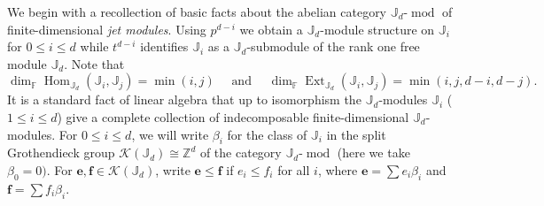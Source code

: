 \documentclass{amsart}
\numberwithin{equation}{section}
\theoremstyle{definition}
\def\FF{\mathbb{F}}
\def\JJ{\mathbb{J}}
\def\ZZ{\mathbb{Z}}
\def\bfe{\mathbf{e}}
\def\bff{\mathbf{f}}
\def\cK{\mathcal{K}}
\def\dim{\operatorname{dim}}
\def\mod{\operatorname{mod}}
\def\Hom{\operatorname{Hom}}
\def\Ext{\operatorname{Ext}}
\def\mod{\operatorname{mod}}
\begin{document}
We begin with a recollection of basic facts about the abelian category $\JJ_d$-$\mod$ of finite-dimensional \emph{jet modules}.  Using $p^{d-i}$ we obtain a $\JJ_d$-module structure on $\JJ_i$ for $0\le i\le d$ while $t^{d-i}$ identifies $\JJ_i$ as a $\JJ_d$-submodule of the rank one free module $\JJ_d$.  Note that 
\begin{equation}\label{eq:hom and ext}
  \dim_\FF\Hom_{\JJ_d}(\JJ_i,\JJ_j)=\min(i,j)\quad\text{ and }\quad\dim_\FF\Ext_{\JJ_d}(\JJ_i,\JJ_j)=\min(i,j,d-i,d-j).
\end{equation}
It is a standard fact of linear algebra that up to isomorphism the $\JJ_d$-modules $\JJ_i$ ($1\le i\le d$) give a complete collection of indecomposable finite-dimensional $\JJ_d$-modules.  For $0\le i\le d$, we will write $\beta_i$ for the class of $\JJ_i$ in the split Grothendieck group $\cK(\JJ_d)\cong\ZZ^d$ of the category $\JJ_d$-$\mod$ (here we take $\beta_0=0)$.  For $\bfe,\bff\in\cK(\JJ_d)$, write $\bfe\le\bff$ if $e_i\le f_i$ for all $i$, where $\bfe=\sum e_i\beta_i$ and $\bff=\sum f_i\beta_i$.
\end{document}
